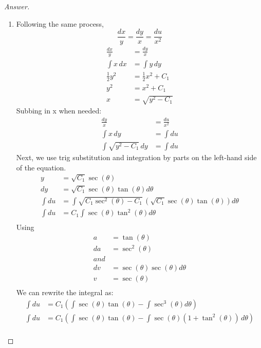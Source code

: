 \documentclass{article}
\theoremstyle{definition}
\renewcommand\qedsymbol{$\blacksquare$}
\newenvironment{ans}{\begin{proof}[Answer]\renewcommand{\qedsymbol}{}}{\end{proof}}
\begin{document}
\begin{ans}
\begin{enumerate}[resume*=answers]
				
			\item Following the same process,
                $$\frac{dx}{y} = \frac{dy}{x} = \frac{du}{x^2}$$
            \begin{align*}
                \frac{dx}{y} &= \frac{dy}{x}\\
                \int x\,dx &= \int y\,dy\\
                \frac{1}{2}y^2 &= \frac{1}{2}x^2 + C_1\\
                y^2 &= x^2 + C_1\\
                x &= \sqrt{y^2 - C_1}
            \end{align*}
            Subbing in x when needed:
            \begin{align*}
                \frac{dy}{x} &= \frac{du}{x^2}\\
                \int x\,dy &= \int du\\
                \int \sqrt{y^2 - C_1}\,dy &= \int du
            \end{align*}
            Next, we use trig substitution and integration by parts on the left-hand side of the equation.
            \begin{align*}
                y &= \sqrt{C_1} \sec{(\theta)}\\
                dy &= \sqrt{C_1} \sec{(\theta)} \tan{(\theta)} d\theta\\
                \int du &= \int \sqrt{C_1 \sec^2{(\theta)} - C_1}\,(\sqrt{C_1}\sec{(\theta)}\tan{(\theta)}) d\theta\\
                \int du &= C_1\int \sec{(\theta)}\tan^2{(\theta)} d\theta\\
            \end{align*}
            Using
            \begin{align*}
            a &= \tan{(\theta)}\\
            da &= \sec^2{(\theta)}\\
            and\\
            dv &= \sec{(\theta)}\sec{(\theta)} d\theta\\
            v &= \sec{(\theta)}\\  
            \end{align*}
            We can rewrite the integral as:
            \begin{align*}
                \int du &= C_1\left( \int \sec{(\theta)}\tan{(\theta)} - \int \sec^3{(\theta)} d\theta \right)\\
                \int du &= C_1\left( \int \sec{(\theta)}\tan{(\theta)} - \int \sec{(\theta)}(1 + \tan^2{(\theta)})\,d\theta \right)\\

\end{align*}
\end{enumerate}
\end{ans}
\end{document}
